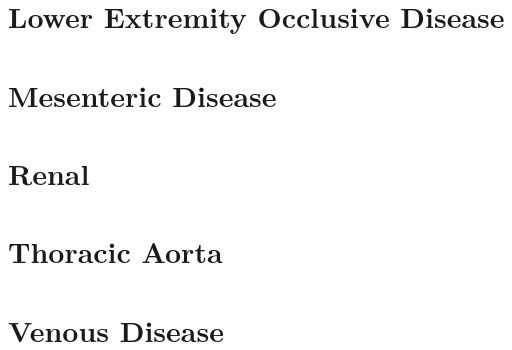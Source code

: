 \documentclass[
]{book}
\begin{document}
\hypertarget{lower-extremity-occlusive-disease}{%
\chapter{Lower Extremity Occlusive Disease}\label{lower-extremity-occlusive-disease}}

\hypertarget{section}{%
\section{}\label{section}}

\hypertarget{mesenteric-disease}{%
\chapter{Mesenteric Disease}\label{mesenteric-disease}}

\hypertarget{section-1}{%
\section{}\label{section-1}}

\hypertarget{renal}{%
\chapter{Renal}\label{renal}}

\hypertarget{section-2}{%
\section{}\label{section-2}}

\hypertarget{thoracic-aorta}{%
\chapter{Thoracic Aorta}\label{thoracic-aorta}}

\hypertarget{section-3}{%
\section{}\label{section-3}}

\hypertarget{venous-disease}{%
\chapter{Venous Disease}\label{venous-disease}}

\hypertarget{section-4}{%
\section{}\label{section-4}}
\end{document}
